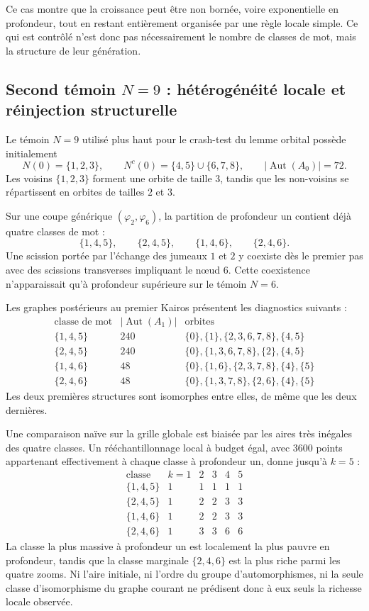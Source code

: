\documentclass[11pt,a4paper]{article}
\theoremstyle{definition}
\theoremstyle{remark}
\begin{document}
Ce cas montre que la croissance peut être non bornée, voire exponentielle en profondeur, tout en restant entièrement organisée par une règle locale simple. Ce qui est contrôlé n'est donc pas nécessairement le nombre de classes de mot, mais la structure de leur génération.

\subsection{Second témoin $N=9$ : hétérogénéité locale et réinjection structurelle}

Le témoin $N=9$ utilisé plus haut pour le crash-test du lemme orbital possède initialement
\[
N(0)=\{1,2,3\},
\qquad
N^c(0)=\{4,5\}\cup\{6,7,8\},
\qquad
|\operatorname{Aut}(A_0)|=72.
\]
Les voisins $\{1,2,3\}$ forment une orbite de taille $3$, tandis que les non-voisins se répartissent en orbites de tailles $2$ et $3$.

Sur une coupe générique $(\varphi_2,\varphi_6)$, la partition de profondeur un contient déjà quatre classes de mot :
\[
\{1,4,5\},\qquad
\{2,4,5\},\qquad
\{1,4,6\},\qquad
\{2,4,6\}.
\]
Une scission portée par l'échange des jumeaux $1$ et $2$ y coexiste dès le premier pas avec des scissions transverses impliquant le nœud $6$. Cette coexistence n'apparaissait qu'à profondeur supérieure sur le témoin $N=6$.

Les graphes postérieurs au premier Kairos présentent les diagnostics suivants :
\[
\begin{array}{c|c|c}
\text{classe de mot} & |\operatorname{Aut}(A_1)| & \text{orbites}\\
\hline
\{1,4,5\} & 240 & \{0\},\{1\},\{2,3,6,7,8\},\{4,5\}\\
\{2,4,5\} & 240 & \{0\},\{1,3,6,7,8\},\{2\},\{4,5\}\\
\{1,4,6\} & 48  & \{0\},\{1,6\},\{2,3,7,8\},\{4\},\{5\}\\
\{2,4,6\} & 48  & \{0\},\{1,3,7,8\},\{2,6\},\{4\},\{5\}
\end{array}
\]
Les deux premières structures sont isomorphes entre elles, de même que les deux dernières.

Une comparaison naïve sur la grille globale est biaisée par les aires très inégales des quatre classes. Un rééchantillonnage local à budget égal, avec $3600$ points appartenant effectivement à chaque classe à profondeur un, donne jusqu'à $k=5$ :
\[
\begin{array}{c|ccccc}
\text{classe} & k=1 & 2 & 3 & 4 & 5\\
\hline
\{1,4,5\} & 1&1&1&1&1\\
\{2,4,5\} & 1&2&2&3&3\\
\{1,4,6\} & 1&2&2&3&3\\
\{2,4,6\} & 1&3&3&6&6
\end{array}
\]
La classe la plus massive à profondeur un est localement la plus pauvre en profondeur, tandis que la classe marginale $\{2,4,6\}$ est la plus riche parmi les quatre zooms. Ni l'aire initiale, ni l'ordre du groupe d'automorphismes, ni la seule classe d'isomorphisme du graphe courant ne prédisent donc à eux seuls la richesse locale observée.
\end{document}
